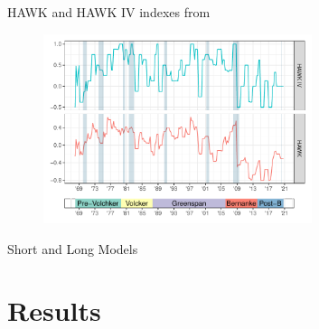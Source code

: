 \documentclass[10pt,aspectratio=169]{beamer}
\begin{document}
\begin{frame}{HAWK and HAWK IV indexes from \cite{HIM2023}}
    \begin{figure}[h!]
        \includegraphics[width=0.7\textwidth]{HAWK_plot_w_heads.pdf}
    \end{figure}
\end{frame}


\begin{frame}{Short and Long Models}
    

\end{frame}










    




\section{Results}
\end{document}
